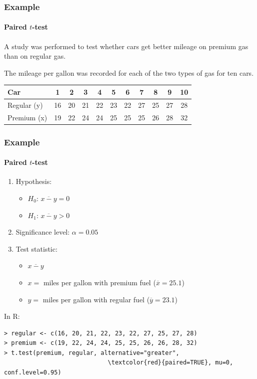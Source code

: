 \documentclass{beamer}
\begin{document}
\begin{frame}
  \frametitle{Example}
  \framesubtitle{Paired $t$-test}
  
  A study was performed to test whether cars get better mileage on premium gas than on regular gas. 
  
  The mileage per gallon was recorded for each of the two types of gas for ten cars.
  
  \vspace{.5cm}
  \centering
  \begin{tabular}{|l|c|c|c|c|c|c|c|c|c|c|}
  	\hline
  	Car     & 1  & 2  & 3  & 4  & 5  & 6  & 7  & 8  & 9  & 10 \\ \hline
  	Regular (y) & 16 & 20 & 21 & 22 & 23 & 22 & 27 & 25 & 27 & 28 \\ \hline
  	Premium (x) & 19 & 22 & 24 & 24 & 25 & 25 & 25 & 26 & 28 & 32 \\ \hline
  \end{tabular} 
\end{frame}

\begin{frame}[fragile]
\frametitle{Example}
\framesubtitle{Paired $t$-test}
\begin{enumerate}
    \item Hypothesis:
    \begin{itemize}
        \item $H_0$: $\overline{x-y} = 0$
        \item $H_1$: $\overline{x-y} > 0$
    \end{itemize}
    \item Significance level: $\alpha = 0.05$
    \item Test statistic:
    \begin{itemize}
        \item $\overline{x-y}$
        \item $x =$ miles per gallon with premium fuel ($\overline{x}=25.1$)
        \item $y =$ miles per gallon with regular fuel ($\overline{y}=23.1$)
    \end{itemize}
\end{enumerate}
\vfill
In R:
{\footnotesize
\begin{Verbatim}[commandchars=\\\{\}]
> regular <- c(16, 20, 21, 22, 23, 22, 27, 25, 27, 28)
> premium <- c(19, 22, 24, 24, 25, 25, 26, 26, 28, 32)
> t.test(premium, regular, alternative="greater",
                             \textcolor{red}{paired=TRUE}, mu=0, conf.level=0.95)
\end{Verbatim}
}
\end{frame}
\end{document}
